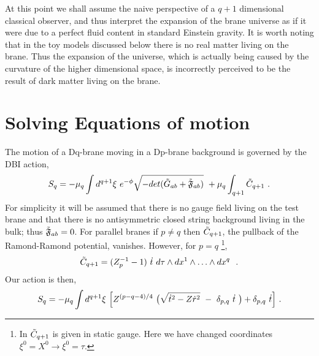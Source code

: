 \documentclass[a4paper,12pt]{article}
\newcommand{\gtab}{\Tilde{G}_{a b}}
\newcommand{\ft}{\Tilde{\mathfrak F}}
\newcommand{\rds}{\dot{r}^2}
\newcommand{\td}{\dot{t}}
\newcommand{\tds}{\dot{t}^2}
\begin{document}
At this point we shall assume the naive perspective of a $q+1$
dimensional classical observer, and thus interpret the expansion of
the brane universe as if it were due to a perfect fluid content in standard
Einstein gravity.  It is worth noting that in the toy models discussed below
there is no real matter living on the brane.  Thus the expansion of
the universe,
which is actually being caused by the curvature of the higher
dimensional space, is incorrectly perceived to be the result of dark matter
living on the brane. 

%
%
%
\section{Solving Equations of motion}
%
%
%
The motion of a Dq-brane moving in a Dp-brane background is governed by
the DBI action\cite{jbbs},
\begin{equation}
S_q = -\mu_q \int d^{q+1}\xi \ e^{- \phi} \sqrt{-det(\gtab + \ft_{a b})}
\ + \mu_q \int_{q+1} \Tilde{C}_{q+1} \ .
\label{DBI}
\end{equation}
For simplicity it will be assumed that there is no gauge field living
on the test brane and that there is no antisymmetric closed string
background living in the bulk; thus $\ft_{a b} = 0$.  
For parallel branes if $p \ne q$ then $\Tilde{C}_{q+1}$, the pullback
of the Ramond-Ramond potential, vanishes.  However, for 
$p=q$ \cite{johnsn}\footnote{In \cite{johnsn} $\Tilde{C}_{q+1}$ is
given in static gauge.  Here we have changed coordinates 
$\xi^0 = X^0 \rightarrow \xi^0 = \tau$.},
$$ 
\Tilde{C}_{q+1} = (Z_p^{-1} - 1) \ \td \
d\tau \wedge dx^1 \wedge \ldots \wedge dx^q \ \ .
$$
Our action is then,
\begin{equation}
S_q = -\mu_q \int d^{q+1}\xi \ \Bigl[Z^{(p-q-4)/4} 
\ \bigl(\sqrt{\tds - Z \rds} \ - \ \delta_{p,q} \ \td \ \bigr) 
+ \delta_{p,q} \ \td \Bigr] \ .
\label{action}
\end{equation}
\end{document}
